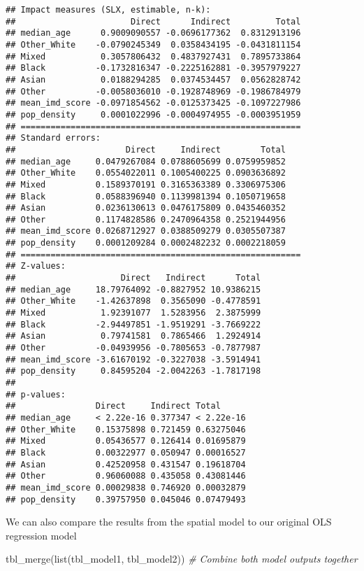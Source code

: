 \documentclass[
]{book}
\newenvironment{Shaded}{\begin{snugshade}}{\end{snugshade}}
\newcommand{\CommentTok}[1]{\textcolor[rgb]{0.56,0.35,0.01}{\textit{#1}}}
\newcommand{\FunctionTok}[1]{\textcolor[rgb]{0.00,0.00,0.00}{#1}}
\newcommand{\NormalTok}[1]{#1}
\begin{document}
\begin{verbatim}
## Impact measures (SLX, estimable, n-k):
##                       Direct      Indirect         Total
## median_age      0.9009090557 -0.0696177362  0.8312913196
## Other_White    -0.0790245349  0.0358434195 -0.0431811154
## Mixed           0.3057806432  0.4837927431  0.7895733864
## Black          -0.1732816347 -0.2225162881 -0.3957979227
## Asian           0.0188294285  0.0374534457  0.0562828742
## Other          -0.0058036010 -0.1928748969 -0.1986784979
## mean_imd_score -0.0971854562 -0.0125373425 -0.1097227986
## pop_density     0.0001022996 -0.0004974955 -0.0003951959
## ========================================================
## Standard errors:
##                      Direct     Indirect        Total
## median_age     0.0479267084 0.0788605699 0.0759959852
## Other_White    0.0554022011 0.1005400225 0.0903636892
## Mixed          0.1589370191 0.3165363389 0.3306975306
## Black          0.0588396940 0.1139981394 0.1050719658
## Asian          0.0236130613 0.0476175809 0.0435460352
## Other          0.1174828586 0.2470964358 0.2521944956
## mean_imd_score 0.0268712927 0.0388509279 0.0305507387
## pop_density    0.0001209284 0.0002482232 0.0002218059
## ========================================================
## Z-values:
##                     Direct   Indirect      Total
## median_age     18.79764092 -0.8827952 10.9386215
## Other_White    -1.42637898  0.3565090 -0.4778591
## Mixed           1.92391077  1.5283956  2.3875999
## Black          -2.94497851 -1.9519291 -3.7669222
## Asian           0.79741581  0.7865466  1.2924914
## Other          -0.04939956 -0.7805653 -0.7877987
## mean_imd_score -3.61670192 -0.3227038 -3.5914941
## pop_density     0.84595204 -2.0042263 -1.7817198
## 
## p-values:
##                Direct     Indirect Total     
## median_age     < 2.22e-16 0.377347 < 2.22e-16
## Other_White    0.15375898 0.721459 0.63275046
## Mixed          0.05436577 0.126414 0.01695879
## Black          0.00322977 0.050947 0.00016527
## Asian          0.42520958 0.431547 0.19618704
## Other          0.96060088 0.435058 0.43081446
## mean_imd_score 0.00029838 0.746920 0.00032879
## pop_density    0.39757950 0.045046 0.07479493
\end{verbatim}

We can also compare the results from the spatial model to our original OLS regression model

\begin{Shaded}
\begin{Highlighting}[]
\FunctionTok{tbl\_merge}\NormalTok{(}\FunctionTok{list}\NormalTok{(tbl\_model1, tbl\_model2)) }\CommentTok{\# Combine both model outputs together}
\end{Highlighting}
\end{Shaded}
\end{document}
